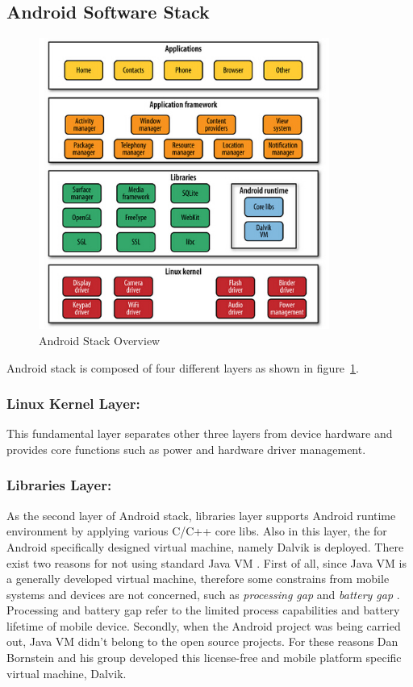 \subsection{Android Software Stack}
\begin{figure}[!htb]
	\centering
	\includegraphics[width=0.85\textwidth]{android-stack.jpg}
		\caption{Android Stack Overview \cite{learn_android}}
	\label{fig:android-stack}
\end{figure}
Android stack is composed of four different layers as shown in figure~\ref{fig:android-stack}.

\subsubsection{Linux Kernel Layer:}This fundamental layer separates other three layers  from  device hardware and provides core functions such as  power and hardware driver management.
\subsubsection{Libraries Layer:}As the second layer of Android stack,  libraries layer supports Android runtime environment by applying various C/C++ core libs.  Also in this layer, the for Android specifically designed virtual machine, namely Dalvik \cite{learn_android} is deployed. There exist two reasons for not using standard Java VM \cite{learn_android}. First of all, since Java VM is a generally developed virtual machine, therefore some constrains from mobile systems and devices are not concerned, such as \emph{processing gap} and \emph{battery gap} \cite{embedded_secure}. Processing and battery gap refer to the limited process capabilities and battery lifetime of mobile device. Secondly, when the Android project was being carried out, Java VM didn't belong to the open source projects. For these reasons Dan Bornstein and his group developed this license-free and mobile platform specific virtual machine, Dalvik. 

